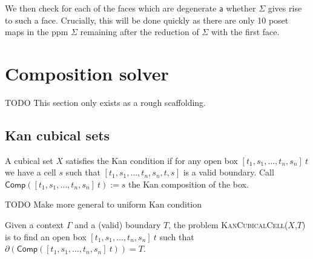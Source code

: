 \documentclass{llncs}
\newcommand{\continuation}{??}
\newenvironment{examplecontd}[1]
{\renewcommand{\continuation}{\ref{#1}}\expcont[continued]}
{\endexpcont}
\newcommand{\todo}[1]{
  \begin{tcolorbox}
    TODO {#1} 
  \end{tcolorbox}
}
\newcommand{\mdef}{:=}
\newcommand{\myproblem}[1]{\textsc{{#1}}}
\newcommand{\pint}[1]{\mathbf{1}^{#1}}
\newcommand{\cset}[1]{\ensuremath{\mathsf{{#1}}}}
\newcommand{\boundary}[1]{\partial({#1})}
\newcommand{\comp}[2]{\mathsf{Comp}({#1}\ {#2})}
\begin{document}
\begin{examplecontd}{exp:sndsphere}
\begin{center}
\end{center}

We then check for each of the faces which are degenerate \cset{a} whether
$\Sigma$ gives rise to such a face. Crucially, this will be done quickly as
there are only 10 poset maps in the ppm $\Sigma$ remaining after the reduction
of $\Sigma$ with the first face.

\end{examplecontd}









\section{Composition solver}
\label{sec:compositionsolver}

\todo{This section only exists as a rough scaffolding.}

\subsection{Kan cubical sets}

A cubical set $X$ satisfies the Kan condition if for any open box
$[t_1, s_1, \ldots , t_n , s_n] \ t$ we have a cell $s$ such that $[t_1,
s_1, \ldots , t_n , s_n , t, s]$ is a valid boundary. Call $\comp{[t_1, s_1,
  \ldots , t_n , s_n]}{t} \mdef s$ the Kan composition of the box. 

\todo{Make more general to uniform Kan condition}

\begin{definition}
  Given a context $\Gamma$ and a (valid) boundary $T$, the problem
  \myproblem{KanCubicalCell}($X$,$T$) is to find an open box $[t_1, s_1, \ldots ,
  t_n , s_n] \ t$ such that $\boundary{\comp{[t_1, s_1, \ldots , t_n , s_n]}{t}} = T$.
\end{definition}
\end{document}

